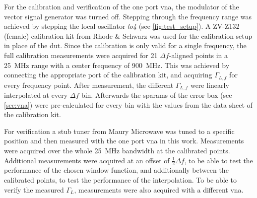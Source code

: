 \documentclass[12pt,a4paper,parskip=full,abstract=true,BCOR=10mm,twoside,open=right]{scrreprt}
\def\device#1{\textit{#1}}
\begin{document}
For the calibration and verification of the one port \gls{vna}, the modulator of
the vector signal generator was turned off. Stepping through the frequency range
was achieved by stepping the local oscillator \device{lo4} (see \cref{fig:test_setup}).
A ZV-Z132 (female) calibration kit from Rhode \& Schwarz was used for the calibration
setup in place of the \gls{dut}. Since the calibration is only valid for a single frequency, the full
calibration measurements were acquired for 21 $\Delta{}f$-aligned points in a
\SI{25}{\mega\hertz} range with a center frequency of \SI{900}{\mega\hertz}. This
was achieved by connecting the appropriate port of the calibration kit, and acquiring
$\Gamma_{L,f}$ for every frequency point. After measurement, the different $\Gamma_{L,f}$ were linearly
interpolated at every $\Delta{}f$ bin. Afterwards the \glspl{sparam} of
the error box (see \cref{sec:vna}) were pre-calculated for every bin with the values
from the data sheet of the calibration kit\cite{zv-z132}.

For verification a stub tuner from Maury Microwave was tuned to a specific position and
then measured with the one port \gls{vna} in this work. Measurements were acquired over
the whole \SI{25}{\mega\hertz} bandwidth at the calibrated points. Additional measurements
were acquired at an offset of $\frac{1}{2}\Delta{}f$, to be able to test the performance
of the chosen window function, and additionally between the calibrated points, to test the
performance of the interpolation. To be able to verify the measured $\Gamma_L$, measurements
were also acquired with a different \gls{vna}.
\end{document}
